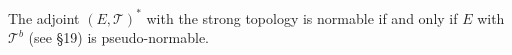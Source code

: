 The adjoint $(E,\mathcal{T})^*$ with the strong topology is normable if and only if $E$ with $\mathcal{T}^b$ (see \S 19) is pseudo-normable.
